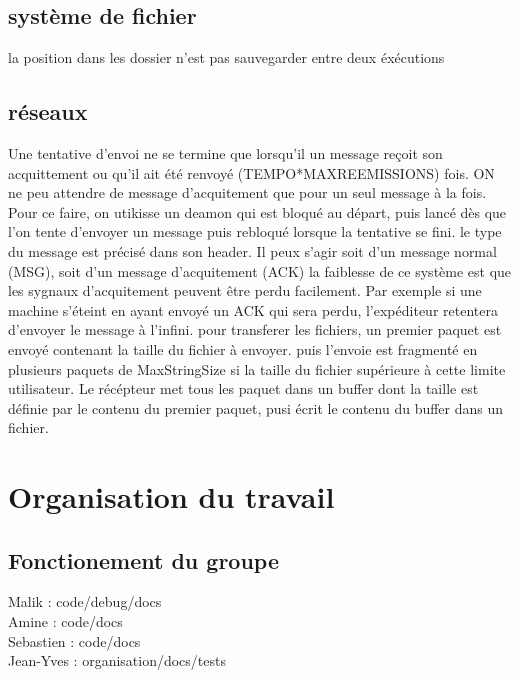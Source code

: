 \documentclass{article}
\begin{document}
	\subsection{système de fichier}
la position dans les dossier n'est pas sauvegarder entre deux éxécutions

	\subsection{réseaux}
		Une tentative d'envoi ne se termine que lorsqu'il un message reçoit son acquittement ou qu'il ait été renvoyé (TEMPO*MAXREEMISSIONS) fois. ON ne peu attendre de message d'acquitement que pour un seul message à la fois. Pour ce faire, on utikisse un deamon qui est bloqué au départ, puis lancé dès que l'on tente d'envoyer un message puis rebloqué lorsque la tentative se fini.
		le type du message est précisé dans son header. Il peux s'agir soit d'un message normal (MSG), soit d'un message d'acquitement (ACK)
		la faiblesse de ce système est que les sygnaux d'acquitement peuvent être perdu facilement. Par exemple si une machine s'éteint en ayant envoyé un ACK qui sera perdu, l'expéditeur retentera d'envoyer le message à l'infini.
		pour transferer les fichiers, un premier paquet est envoyé contenant la taille du fichier à envoyer. puis l'envoie est fragmenté en plusieurs paquets de MaxStringSize si la taille du fichier supérieure à cette limite utilisateur. Le récépteur met tous les paquet dans un buffer dont la taille est définie par le contenu du premier paquet, pusi écrit le contenu du buffer dans un fichier.
		

\section{Organisation du travail}
	\subsection{Fonctionement du groupe}
		Malik : code/debug/docs\\
		Amine : code/docs\\
		Sebastien : code/docs\\
		Jean-Yves : organisation/docs/tests\\
\end{document}
